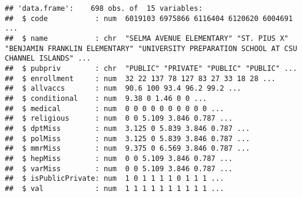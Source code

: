 \documentclass[]{article}
\newenvironment{Shaded}{\begin{snugshade}}{\end{snugshade}}
\newcommand{\CommentTok}[1]{\textcolor[rgb]{0.56,0.35,0.01}{\textit{#1}}}
\newcommand{\DataTypeTok}[1]{\textcolor[rgb]{0.13,0.29,0.53}{#1}}
\newcommand{\DecValTok}[1]{\textcolor[rgb]{0.00,0.00,0.81}{#1}}
\newcommand{\KeywordTok}[1]{\textcolor[rgb]{0.13,0.29,0.53}{\textbf{#1}}}
\newcommand{\NormalTok}[1]{#1}
\newcommand{\OperatorTok}[1]{\textcolor[rgb]{0.81,0.36,0.00}{\textbf{#1}}}
\newcommand{\OtherTok}[1]{\textcolor[rgb]{0.56,0.35,0.01}{#1}}
\newcommand{\StringTok}[1]{\textcolor[rgb]{0.31,0.60,0.02}{#1}}
\begin{document}
\begin{Shaded}
\end{Shaded}

\begin{verbatim}
## 'data.frame':    698 obs. of  15 variables:
##  $ code           : num  6019103 6975866 6116404 6120620 6004691 ...
##  $ name           : chr  "SELMA AVENUE ELEMENTARY" "ST. PIUS X" "BENJAMIN FRANKLIN ELEMENTARY" "UNIVERSITY PREPARATION SCHOOL AT CSU CHANNEL ISLANDS" ...
##  $ pubpriv        : chr  "PUBLIC" "PRIVATE" "PUBLIC" "PUBLIC" ...
##  $ enrollment     : num  32 22 137 78 127 83 27 33 18 28 ...
##  $ allvaccs       : num  90.6 100 93.4 96.2 99.2 ...
##  $ conditional    : num  9.38 0 1.46 0 0 ...
##  $ medical        : num  0 0 0 0 0 0 0 0 0 0 ...
##  $ religious      : num  0 0 5.109 3.846 0.787 ...
##  $ dptMiss        : num  3.125 0 5.839 3.846 0.787 ...
##  $ polMiss        : num  3.125 0 5.839 3.846 0.787 ...
##  $ mmrMiss        : num  9.375 0 6.569 3.846 0.787 ...
##  $ hepMiss        : num  0 0 5.109 3.846 0.787 ...
##  $ varMiss        : num  0 0 5.109 3.846 0.787 ...
##  $ isPublicPrivate: num  1 0 1 1 1 1 0 1 1 1 ...
##  $ val            : num  1 1 1 1 1 1 1 1 1 1 ...
\end{verbatim}

\begin{Shaded}
\end{Shaded}
\end{document}

